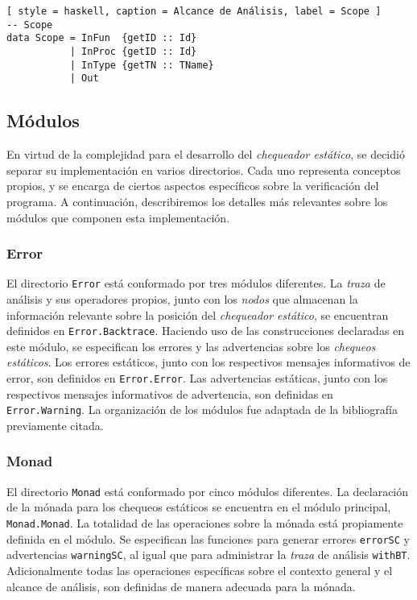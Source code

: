 \begin{lstlisting}[ style = haskell, caption = Alcance de Análisis, label = Scope ]
-- Scope
data Scope = InFun  {getID :: Id}
           | InProc {getID :: Id}
           | InType {getTN :: TName}
           | Out
\end{lstlisting}

\subsection{Módulos}

En virtud de la complejidad para el desarrollo del \textit{chequeador estático}, se decidió separar su implementación en varios directorios.
Cada uno representa conceptos propios, y se encarga de ciertos aspectos específicos sobre la verificación del programa.
A continuación, describiremos los detalles más relevantes sobre los módulos que componen esta implementación.

\subsubsection{Error}

El directorio \lstinline[style = module]{Error} está conformado por tres módulos diferentes.
La \textit{traza} de análisis y sus operadores propios, junto con los \textit{nodos} que almacenan la información relevante sobre la posición del \textit{chequeador estático}, se encuentran definidos en \lstinline[style = module]{Error.Backtrace}.
Haciendo uso de las construcciones declaradas en este módulo, se especifican los errores y las advertencias sobre los \textit{chequeos estáticos}.
Los errores estáticos, junto con los respectivos mensajes informativos de error, son definidos en \lstinline[style = module]{Error.Error}.
Las advertencias estáticas, junto con los respectivos mensajes informativos de advertencia, son definidas en \lstinline[style = module]{Error.Warning}.
La organización de los módulos fue adaptada de la bibliografía previamente citada.

\subsubsection{Monad}

El directorio \lstinline[style = module]{Monad} está conformado por cinco módulos diferentes.
La declaración de la mónada para los chequeos estáticos se encuentra en el módulo principal, \lstinline[style = module]{Monad.Monad}.
La totalidad de las operaciones sobre la mónada está propiamente definida en el módulo.
Se especifican las funciones para generar errores \lstinline[style = haskell]{errorSC} y advertencias \lstinline[style = haskell]{warningSC}, al igual que para administrar la \textit{traza} de análisis \lstinline[style = haskell]{withBT}.
Adicionalmente todas las operaciones específicas sobre el contexto general y el alcance de análisis, son definidas de manera adecuada para la mónada.

